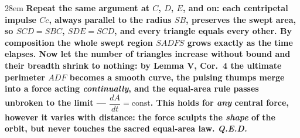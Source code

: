 \documentclass[border=4pt]{standalone}
\begin{document}
\begin{varwidth}{28em}
\large\bfseries
Repeat the same argument at $C$, $D$, $E$, and on: each \textcolor{impulsered}{centripetal impulse $Cc$, always parallel      to the radius $SB$}, preserves the swept area, so $SCD = SBC$, $SDE = SCD$, and every triangle equals every      other. By composition the whole \textcolor{pathblue}{swept region $SADFS$} grows exactly as the time elapses. Now let the      number of triangles increase without bound and their breadth shrink to nothing: by \textbf{Lemma V, Cor.~4} the      ultimate perimeter $ADF$ becomes a smooth \textcolor{pathblue}{curve}, the pulsing thumps merge into a force acting      \emph{continually}, and the equal-area rule passes unbroken to the limit — $\dfrac{dA}{dt} = \text{const}$.      This holds for \emph{any} central force, however it varies with distance: the force sculpts the \emph{shape} of      the orbit, but never touches the sacred equal-area law. \textit{Q.E.D.}
\end{varwidth}
\end{document}
